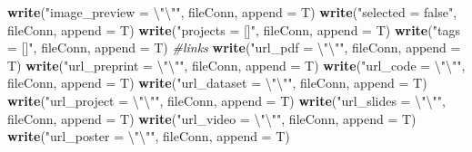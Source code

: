 \documentclass[12pt,]{book}
\newenvironment{Shaded}{\begin{snugshade}}{\end{snugshade}}
\newcommand{\KeywordTok}[1]{\textcolor[rgb]{0.13,0.29,0.53}{\textbf{#1}}}
\newcommand{\DataTypeTok}[1]{\textcolor[rgb]{0.13,0.29,0.53}{#1}}
\newcommand{\CharTok}[1]{\textcolor[rgb]{0.31,0.60,0.02}{#1}}
\newcommand{\StringTok}[1]{\textcolor[rgb]{0.31,0.60,0.02}{#1}}
\newcommand{\CommentTok}[1]{\textcolor[rgb]{0.56,0.35,0.01}{\textit{#1}}}
\newcommand{\NormalTok}[1]{#1}
\theoremstyle{definition}
\theoremstyle{definition}
\theoremstyle{definition}
\theoremstyle{remark}
\begin{document}
\begin{Shaded}
\begin{Highlighting}[]
{{{{{{                             \KeywordTok{write}\NormalTok{(}\StringTok{"image_preview = }\CharTok{\textbackslash{}"\textbackslash{}"}\StringTok{"}\NormalTok{,}
\NormalTok{                             fileConn,}
                             \DataTypeTok{append =}\NormalTok{ T)}
                             \KeywordTok{write}\NormalTok{(}\StringTok{"selected = false"}\NormalTok{, fileConn, }\DataTypeTok{append =}\NormalTok{ T)}
                             \KeywordTok{write}\NormalTok{(}\StringTok{"projects = []"}\NormalTok{, fileConn, }\DataTypeTok{append =}\NormalTok{ T)}
                             \KeywordTok{write}\NormalTok{(}\StringTok{"tags = []"}\NormalTok{, fileConn, }\DataTypeTok{append =}\NormalTok{ T)}
                             \CommentTok{#links}
                             \KeywordTok{write}\NormalTok{(}\StringTok{"url_pdf = }\CharTok{\textbackslash{}"\textbackslash{}"}\StringTok{"}\NormalTok{, fileConn, }\DataTypeTok{append =}\NormalTok{ T)}
                             \KeywordTok{write}\NormalTok{(}\StringTok{"url_preprint = }\CharTok{\textbackslash{}"\textbackslash{}"}\StringTok{"}\NormalTok{,}
\NormalTok{                             fileConn,}
                             \DataTypeTok{append =}\NormalTok{ T)}
                             \KeywordTok{write}\NormalTok{(}\StringTok{"url_code = }\CharTok{\textbackslash{}"\textbackslash{}"}\StringTok{"}\NormalTok{, fileConn, }\DataTypeTok{append =}\NormalTok{ T)}
                             \KeywordTok{write}\NormalTok{(}\StringTok{"url_dataset = }\CharTok{\textbackslash{}"\textbackslash{}"}\StringTok{"}\NormalTok{,}
\NormalTok{                             fileConn,}
                             \DataTypeTok{append =}\NormalTok{ T)}
                             \KeywordTok{write}\NormalTok{(}\StringTok{"url_project = }\CharTok{\textbackslash{}"\textbackslash{}"}\StringTok{"}\NormalTok{,}
\NormalTok{                             fileConn,}
                             \DataTypeTok{append =}\NormalTok{ T)}
                             \KeywordTok{write}\NormalTok{(}\StringTok{"url_slides = }\CharTok{\textbackslash{}"\textbackslash{}"}\StringTok{"}\NormalTok{, fileConn, }\DataTypeTok{append =}\NormalTok{ T)}
                             \KeywordTok{write}\NormalTok{(}\StringTok{"url_video = }\CharTok{\textbackslash{}"\textbackslash{}"}\StringTok{"}\NormalTok{, fileConn, }\DataTypeTok{append =}\NormalTok{ T)}
                             \KeywordTok{write}\NormalTok{(}\StringTok{"url_poster = }\CharTok{\textbackslash{}"\textbackslash{}"}\StringTok{"}\NormalTok{, fileConn, }\DataTypeTok{append =}\NormalTok{ T)}
}}}}}}
\end{Highlighting}
\end{Shaded}
\end{document}
